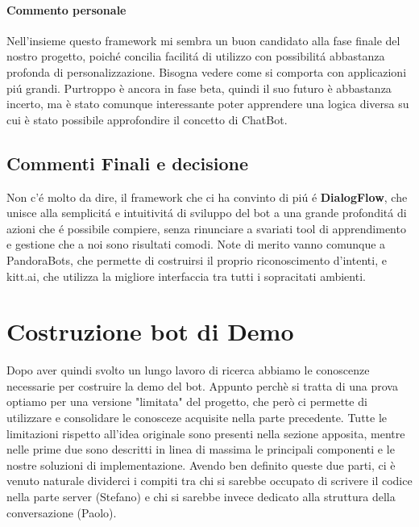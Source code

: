 \documentclass[]{article}
\begin{document}
\paragraph{Commento personale}
Nell’insieme questo framework mi sembra un buon candidato alla fase finale del nostro progetto, poiché concilia facilitá di utilizzo con possibilitá abbastanza profonda di personalizzazione. Bisogna vedere come si comporta con applicazioni piú grandi. Purtroppo è ancora in fase beta, quindi il suo futuro è abbastanza incerto, ma è stato comunque interessante poter apprendere una logica diversa su cui è stato possibile approfondire il concetto di ChatBot.


\subsection{Commenti Finali e decisione}
Non c'é molto da dire, il framework che ci ha convinto di piú é \textbf{DialogFlow}, che unisce alla semplicitá e intuitivitá di sviluppo del bot a una grande profonditá di azioni che é possibile compiere, senza rinunciare a svariati tool di apprendimento e gestione che a noi sono risultati comodi. Note di merito vanno comunque a PandoraBots, che permette di costruirsi il proprio riconoscimento d'intenti, e kitt.ai, che utilizza la migliore interfaccia tra tutti i sopracitati ambienti. 

\section{Costruzione bot di Demo}
Dopo aver quindi svolto un lungo lavoro di ricerca abbiamo le conoscenze necessarie per costruire la demo del bot. Appunto perchè si tratta di una prova optiamo per una versione "limitata" del progetto, che però ci permette di utilizzare e consolidare le conosceze acquisite nella parte precedente. Tutte le limitazioni rispetto all'idea originale sono presenti nella sezione apposita, mentre nelle prime due sono descritti in linea di massima le principali componenti e le nostre soluzioni di implementazione. Avendo ben definito queste due parti, ci è venuto naturale dividerci i compiti tra chi si sarebbe occupato di scrivere il codice nella parte server (Stefano) e chi si sarebbe invece dedicato alla struttura della conversazione (Paolo).
\end{document}
